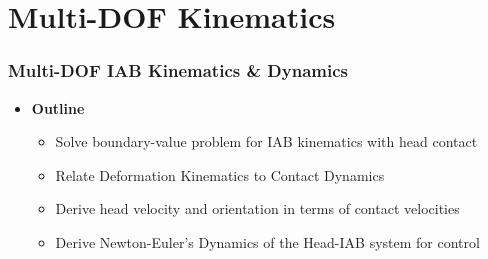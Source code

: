 \section{Multi-DOF Kinematics}
\begin{frame}
	\frametitle{Multi-DOF IAB Kinematics \& Dynamics}
	\begin{itemize}
		\item \textbf{Outline}
		\begin{itemize}
			\item Solve boundary-value problem for IAB kinematics with head contact
			\vspace{0.1in}
			\item Relate Deformation Kinematics to Contact Dynamics
			\vspace{0.1in}
			\item Derive head velocity and orientation in terms of contact velocities
			\vspace{0.1in}
			\item Derive Newton-Euler's Dynamics of the Head-IAB system for control 
		\end{itemize}
	\end{itemize}
\end{frame}


